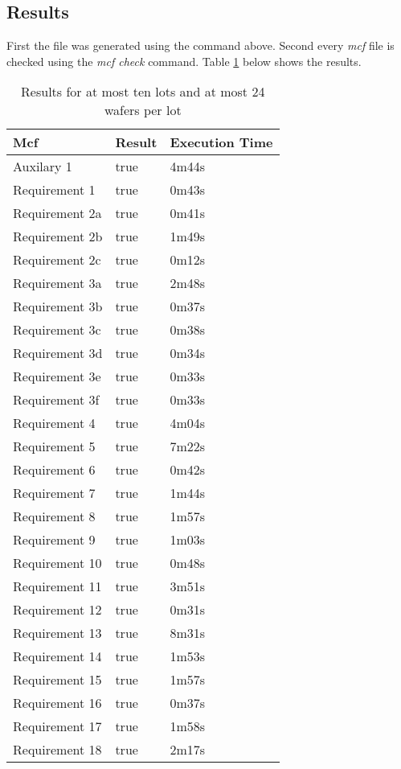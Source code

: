 \subsection{Results}
First the  file was generated using the  command above. Second every \textit{mcf} file is checked using the \textit{mcf check} command.
Table \ref{tab:results1024} below shows the results.
\begin{table}[!hb]
    \centering
    \begin{tabular}{|l|l|l|}
        \hline
        \textbf{Mcf} & \textbf{Result} & \textbf{Execution Time} \\ \hline
			Auxilary 1 & true & 4m44s \\ \hline
			Requirement 1 & true & 0m43s \\ \hline
			Requirement 2a & true & 0m41s \\ \hline
			Requirement 2b & true & 1m49s \\ \hline
			Requirement 2c & true & 0m12s \\ \hline
			Requirement 3a & true & 2m48s \\ \hline
			Requirement 3b & true & 0m37s \\ \hline
			Requirement 3c & true & 0m38s \\ \hline
			Requirement 3d & true & 0m34s \\ \hline
			Requirement 3e & true & 0m33s \\ \hline
			Requirement 3f & true & 0m33s \\ \hline
			Requirement 4 & true & 4m04s \\ \hline
			Requirement 5 & true & 7m22s \\ \hline
			Requirement 6 & true & 0m42s \\ \hline
			Requirement 7 & true & 1m44s \\ \hline
			Requirement 8 & true & 1m57s \\ \hline
			Requirement 9 & true & 1m03s \\ \hline
			Requirement 10 & true & 0m48s \\ \hline
			Requirement 11 & true & 3m51s \\ \hline
			Requirement 12 & true & 0m31s \\ \hline
			Requirement 13 & true & 8m31s \\ \hline
			Requirement 14 & true & 1m53s \\ \hline
			Requirement 15 & true & 1m57s \\ \hline
			Requirement 16 & true & 0m37s \\ \hline
			Requirement 17 & true & 1m58s \\ \hline
			Requirement 18 & true & 2m17s \\ \hline
    \end{tabular}
    \caption{Results for at most ten lots and at most 24 wafers per lot}
    \label{tab:results1024}
\end{table}
